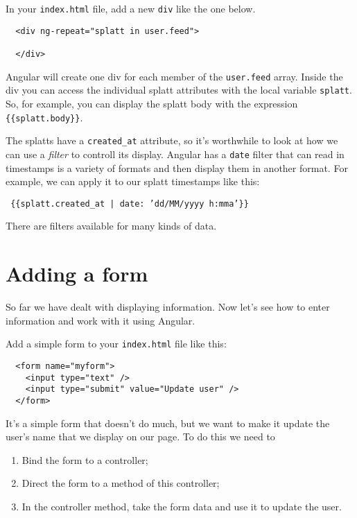\documentclass{article}
\begin{document}
In your \texttt{index.html} file, add a new \texttt{div} like the one below.

\begin{verbatim}
  <div ng-repeat="splatt in user.feed">

  </div>
\end{verbatim}

Angular will create one div for each member of the \texttt{user.feed} array. Inside the div you can access the individual splatt attributes with the local variable \texttt{splatt}.  So, for example, you can display the splatt body with the expression \texttt{\{\{splatt.body\}\}}.

The splatts have a \texttt{created\_at} attribute, so it's worthwhile to look at how we can use a \emph{filter} to controll its display.  Angular has a \texttt{date} filter that can read in timestamps is a variety of formats and then display them in another format.  For example, we can apply it to our splatt timestamps like this:

\texttt{ \{\{splatt.created\_at | date: 'dd/MM/yyyy h:mma'\}\} }

There are filters available for many kinds of data.

\newpage

\section{Adding a form}
So far we have dealt with displaying information.  Now let's see how to enter information and work with it using Angular.

Add a simple form to your \texttt{index.html} file like this:

\begin{verbatim}
  <form name="myform">
    <input type="text" />
    <input type="submit" value="Update user" />
  </form>
\end{verbatim}

It's a simple form that doesn't do much, but we want to make it update the user's name that we display on our page.  To do this we need to 

\begin{enumerate}
  \item Bind the form to a controller;
  \item Direct the form to a method of this controller;
  \item In the controller method, take the form data and use it to update
        the user.
\end{enumerate}
\end{document}
